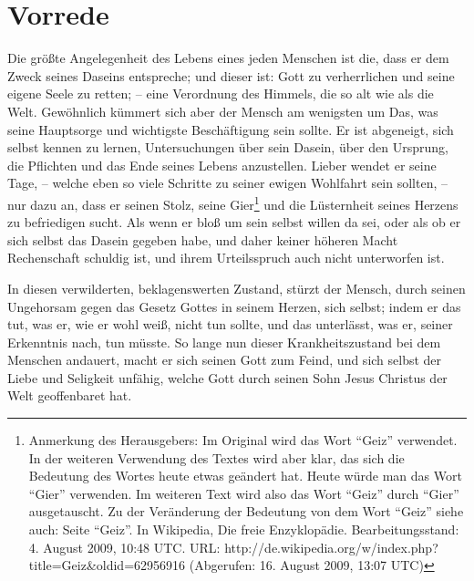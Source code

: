 \chapter{Vorrede}

Die größte Angelegenheit des Lebens eines jeden Menschen ist die, dass er dem Zweck seines Daseins entspreche; und dieser ist: Gott zu verherrlichen und seine eigene Seele zu retten; -- eine Verordnung des Himmels, die so alt wie als die Welt. Gewöhnlich kümmert sich aber der Mensch am wenigsten um Das, was seine Hauptsorge und wichtigste Beschäftigung sein sollte. Er ist abgeneigt, sich selbst kennen zu lernen, Untersuchungen über sein Dasein, über den Ursprung, die Pflichten und das Ende seines Lebens anzustellen. Lieber wendet er seine Tage, -- welche eben so viele Schritte zu seiner ewigen Wohlfahrt sein sollten, -- nur dazu an, dass er seinen Stolz, seine Gier\footnote{Anmerkung des Herausgebers: Im Original wird das Wort "`Geiz"' verwendet. In der weiteren Verwendung des Textes wird aber klar, das sich die Bedeutung des Wortes heute etwas geändert hat. Heute würde man das Wort "`Gier"' verwenden. Im weiteren Text wird also das Wort "`Geiz"' durch "`Gier"' ausgetauscht. Zu der Veränderung der Bedeutung von dem Wort "`Geiz"' siehe auch: Seite "`Geiz"'. In Wikipedia, Die freie Enzyklopädie. Bearbeitungsstand: 4. August 2009, 10:48 UTC. URL: http://de.wikipedia.org/w/index.php?title=Geiz\&oldid=62956916 (Abgerufen: 16. August 2009, 13:07 UTC) } und die Lüsternheit seines Herzens zu befriedigen sucht. Als wenn er bloß um sein selbst willen da sei, oder als ob er sich selbst das Dasein gegeben habe, und daher keiner höheren Macht Rechenschaft schuldig ist, und ihrem Urteilsspruch auch nicht unterworfen ist.

In diesen verwilderten, beklagenswerten Zustand, stürzt der Mensch, durch seinen Ungehorsam gegen das Gesetz Gottes in seinem Herzen, sich selbst; indem er das tut, was er, wie er wohl weiß, nicht tun sollte, und das unterlässt, was er, seiner Erkenntnis nach, tun müsste. So lange nun dieser Krankheitszustand bei dem Menschen andauert, macht er sich seinen Gott zum Feind, und sich selbst der Liebe und Seligkeit unfähig, welche Gott durch seinen Sohn Jesus Christus der Welt geoffenbaret hat.

